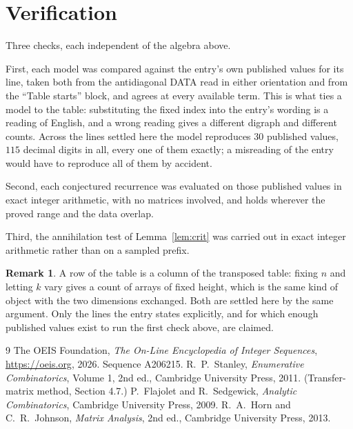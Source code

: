 \documentclass[11pt,a4paper]{article}
\theoremstyle{plain}
\theoremstyle{definition}
\newtheorem{remark}[theorem]{Remark}
\begin{document}
\section{Verification}

Three checks, each independent of the algebra above.

First, each model was compared against the entry's own published values for its line, taken
both from the antidiagonal DATA read in either orientation and from the ``Table starts''
block, and agrees at every available term. This is what ties a model to the table:
substituting the fixed index into the entry's wording is a reading of English, and a wrong
reading gives a different digraph and different counts. Across the lines settled here the
model reproduces $30$ published values, $115$ decimal digits in all, every one of
them exactly; a misreading of the entry would have to reproduce all of them by accident.

Second, each conjectured recurrence was evaluated on those published values in exact
integer arithmetic, with no matrices involved, and holds wherever the proved range and the
data overlap.

Third, the annihilation test of Lemma~\ref{lem:crit} was carried out in exact integer
arithmetic rather than on a sampled prefix.

\begin{remark}
A row of the table is a column of the transposed table: fixing $n$ and letting $k$ vary gives a
count of arrays of fixed height, which is the same kind of object with the two dimensions
exchanged. Both are settled here by the same argument. Only the lines the entry states
explicitly, and for which enough published values exist to run the first check above, are
claimed.
\end{remark}

\begin{thebibliography}{9}
 The OEIS Foundation, \emph{The On-Line Encyclopedia of Integer
Sequences}, \url{https://oeis.org}, 2026. Sequence A206215.
 R.~P.~Stanley, \emph{Enumerative Combinatorics}, Volume 1, 2nd ed.,
Cambridge University Press, 2011. (Transfer-matrix method, Section 4.7.)
 P.~Flajolet and R.~Sedgewick, \emph{Analytic Combinatorics}, Cambridge
University Press, 2009.
 R.~A.~Horn and C.~R.~Johnson, \emph{Matrix Analysis}, 2nd ed., Cambridge
University Press, 2013.
\end{thebibliography}
\end{document}

